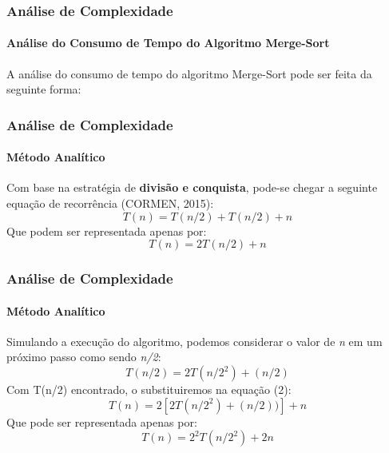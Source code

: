 \documentclass[aspectratio=169]{beamer}
\begin{document}
\begin{frame}
	\frametitle{Análise de Complexidade}
	\framesubtitle{Análise do Consumo de Tempo do Algoritmo Merge-Sort}
	A análise do consumo de tempo do algoritmo Merge-Sort pode ser feita da seguinte forma:
	\vspace{1cm}
	\begin{minipage}[c]{0.49\linewidth}
		\vspace{0.7cm}
\end{minipage}
\hfill
\end{frame}

\begin{frame}
	\frametitle{Análise de Complexidade}
	\framesubtitle{Método Analítico}
	Com base na estratégia de\textbf{ divisão e conquista}, pode-se chegar a seguinte equação de recorrência (CORMEN, 2015):
	\begin{equation}
	T(n) = T(n/2) + T(n/2) + n
	\end{equation}
	Que podem ser representada apenas por:
	\begin{equation}
	T(n) = 2T(n/2) + n
	\end{equation}
\end{frame}

\begin{frame}
	\frametitle{Análise de Complexidade}
	\framesubtitle{Método Analítico}
	Simulando a execução do algoritmo, podemos considerar o valor de \textit{n} em um próximo passo como sendo \textit{n/2}:
	\begin{equation}
	T(n/2) = 2T(n/2^{2}) + (n/2)
	\end{equation}
	Com T(n/2) encontrado, o substituiremos na equação (2):
	\begin{equation}
	T(n) = 2[2T(n/2^{2})+ (n/2))] + n
	\end{equation}
	Que pode ser representada apenas por:
	\begin{equation}
	T(n) = 2^{2}T(n/2^{2}) + 2n
	\end{equation}
\end{frame}
\end{document}
